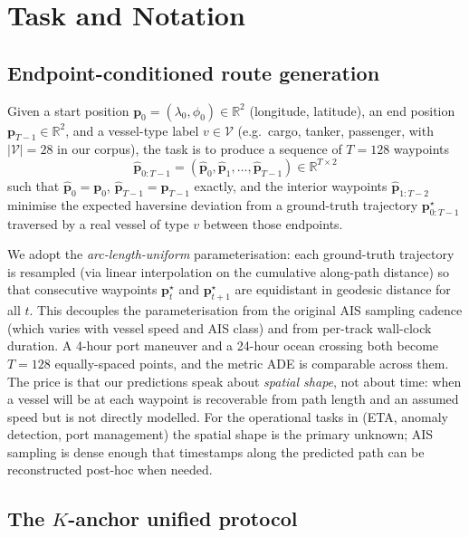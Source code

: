 \documentclass[11pt]{article}
\begin{document}
\section{Task and Notation}
\label{sec:task}

\subsection{Endpoint-conditioned route generation}
Given a start position $\mathbf{p}_0 = (\lambda_0, \phi_0) \in \mathbb{R}^2$
(longitude, latitude), an end position $\mathbf{p}_{T-1} \in \mathbb{R}^2$,
and a vessel-type label $v \in \mathcal{V}$ (e.g.\ cargo, tanker, passenger,
with $|\mathcal{V}|=28$ in our corpus), the task is to produce
a sequence of $T=128$ waypoints
\begin{equation}
\hat{\mathbf{p}}_{0:T-1} = (\hat{\mathbf{p}}_0, \hat{\mathbf{p}}_1, \dots, \hat{\mathbf{p}}_{T-1})
\in \mathbb{R}^{T \times 2}
\end{equation}
such that $\hat{\mathbf{p}}_0 = \mathbf{p}_0$, $\hat{\mathbf{p}}_{T-1} = \mathbf{p}_{T-1}$
exactly, and the interior waypoints $\hat{\mathbf{p}}_{1:T-2}$ minimise
the expected haversine deviation from a ground-truth trajectory
$\mathbf{p}_{0:T-1}^\star$ traversed by a real vessel of type $v$ between
those endpoints.

We adopt the \emph{arc-length-uniform} parameterisation: each ground-truth
trajectory is resampled (via linear interpolation on the cumulative
along-path distance) so that consecutive waypoints $\mathbf{p}_t^\star$ and
$\mathbf{p}_{t+1}^\star$ are equidistant in geodesic distance for all $t$.
This decouples the parameterisation from the original AIS sampling cadence
(which varies with vessel speed and AIS class) and from per-track wall-clock
duration. A 4-hour port maneuver and a 24-hour ocean crossing both become
$T=128$ equally-spaced points, and the metric ADE is comparable across
them. The price is that our predictions speak about \emph{spatial shape},
not about time: when a vessel will be at each waypoint is recoverable
from path length and an assumed speed but is not directly modelled. For
the operational tasks in  (ETA, anomaly detection, port
management) the spatial shape is the primary unknown; AIS sampling is
dense enough that timestamps along the predicted path can be reconstructed
post-hoc when needed.

\subsection{The $K$-anchor unified protocol}
\label{sec:k_anchor}
\end{document}

